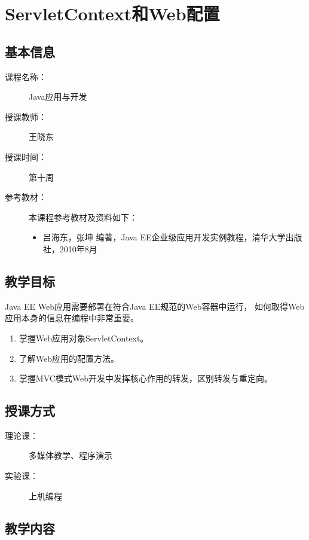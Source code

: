 \chapter{ServletContext和Web配置}
\label{chp:JavaEE-ServletContext-and-Web-configuration}

\section*{基本信息}
\sline
\begin{description}
\item[课程名称：] Java应用与开发
\item[授课教师：] 王晓东
\item[授课时间：] 第十周
\item[参考教材：] 本课程参考教材及资料如下：
  \begin{itemize}
  \item 吕海东，张坤 编著，Java EE企业级应用开发实例教程，清华大学出版社，2010年8月
  \end{itemize}
\end{description}

\section*{教学目标}

\sline

{\hei\Blue Java EE Web应用需要部署在符合Java EE规范的Web容器中运行，
  如何取得Web应用本身的信息在编程中非常重要。}

\begin{enumerate}
\item 掌握Web应用对象ServletContext。
\item 了解Web应用的配置方法。
\item 掌握MVC模式Web开发中发挥核心作用的转发，区别{\hei 转发}与{\hei 重定向}。
\end{enumerate}  

\section*{授课方式}

\sline
\begin{description}
\item[理论课：] 多媒体教学、程序演示
\item[实验课：] 上机编程
\end{description}

\newpage
\section*{教学内容}
\sline

